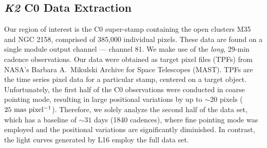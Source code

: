 \documentclass[apjl]{emulateapj}
\begin{document}
\subsection{\textit{K2} C0 Data Extraction}
\label{subsec:data}
Our region of interest is the C0 super-stamp containing the open
clusters M35 and NGC 2158, comprised of 385,000 individual pixels.
These data are found on a single module output channel --- channel 81.
We make use of the \textit{long}, 29-min cadence observations.  Our data
were obtained as target pixel files (TPFs) from NASA's Barbara
A.~Mikulski Archive for Space Telescopes (MAST). TPFs are the time
series pixel data for a particular stamp, centered on a target object.
Unfortunately, the first half of the C0 observations were conducted in
coarse pointing mode, resulting in large positional variations by up to
$\sim$20 pixels ($25 \ \rm mas \ pixel^{-1}$).  Therefore, we solely
analyze the second half of the data set, which has a baseline of
${\sim}31$ days (1840 cadences), where fine pointing mode was employed
and the positional variations are significantly diminished.  In
contrast, the light curves generated by L16 employ the full data set.

\end{document}
